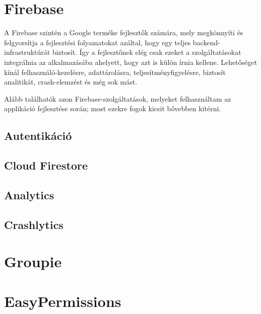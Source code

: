 \section{Firebase}

A Firebase szintén a Google terméke fejlesztők számára, mely megkönnyíti és felgyorsítja a fejlesztési folyamatokat azáltal, hogy egy teljes backend-infrastruktúrát biztosít. Így a fejlesztőnek elég csak ezeket a szolgáltatásokat integrálnia az alkalmazásába ahelyett, hogy azt is külön írnia kellene. Lehetőséget kínál felhasználó-kezelésre, adattárolásra, teljesítményfigyelésre, biztosít analitikát, crash-elemzést és még sok mást. 

Alább találhatók azon Firebase-szolgáltatások, melyeket felhasználtam az applikáció fejlesztése során; most ezekre fogok kicsit bővebben kitérni.

\subsection{Autentikáció}
\subsection{Cloud Firestore}
\subsection{Analytics}
\subsection{Crashlytics}

\section{Groupie}

\section{EasyPermissions}